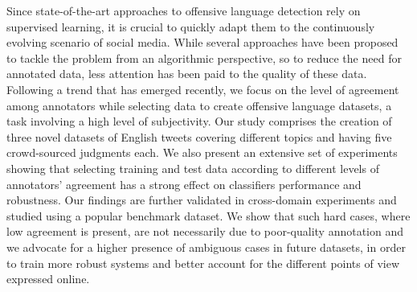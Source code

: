 Since state-of-the-art approaches to offensive language detection rely on supervised learning, it is crucial to quickly adapt them to the continuously evolving scenario of social media. While several approaches have been proposed to tackle the problem from an algorithmic perspective, so to reduce the need for annotated data, less attention has been paid to the quality of these data. Following a trend that has emerged recently, we focus on the level of agreement among annotators while selecting data to create offensive language datasets, a task involving a high level of subjectivity. Our study comprises the creation of three novel datasets of English tweets covering different topics and having five crowd-sourced judgments each. We also present an extensive set of experiments showing that  selecting training and test data according to different levels of annotators' agreement has a strong effect on classifiers performance and robustness. Our findings are further validated in cross-domain experiments and studied using a popular benchmark dataset. We show that such hard cases, where low agreement is present, are not necessarily due to poor-quality annotation and we advocate for a higher presence of ambiguous cases in future datasets, in order to train more robust systems and better account for the different points of view expressed online.
